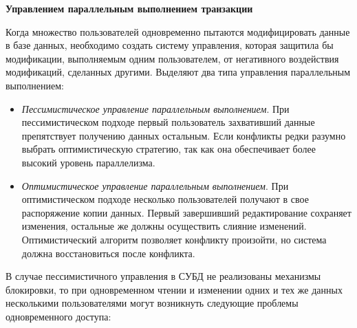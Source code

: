 \textbf{Управлением параллельным выполнением транзакции}

Когда множество пользователей одновременно пытаются модифицировать данные в базе данных, необходимо создать систему управления, которая защитила бы модификации, выполняемым одним пользователем, от негативного воздействия модификаций, сделанных другими.
Выделяют два типа управления параллельным выполнением:
\begin{itemize}
	\item \textit{Пессимистическое управление параллельным выполнением}. При пессимистическом подходе первый пользователь захвативший данные препятствует получению данных остальным. Если конфликты редки разумно выбрать оптимистическую стратегию, так как она обеспечивает более высокий уровень параллелизма.
	\item \textit{Оптимистическое управление параллельным выполнением}. При оптимистическом подходе несколько пользователей получают в свое распоряжение копии данных. Первый завершивший редактирование сохраняет изменения, остальные же должны осуществить слияние изменений. Оптимистический алгоритм позволяет конфликту произойти, но система должна восстановиться после конфликта.
\end{itemize}
В случае пессимистичного управления в СУБД не реализованы механизмы блокировки, то при одновременном чтении и изменении одних и тех же данных несколькими пользователями могут возникнуть следующие проблемы одновременного доступа:
